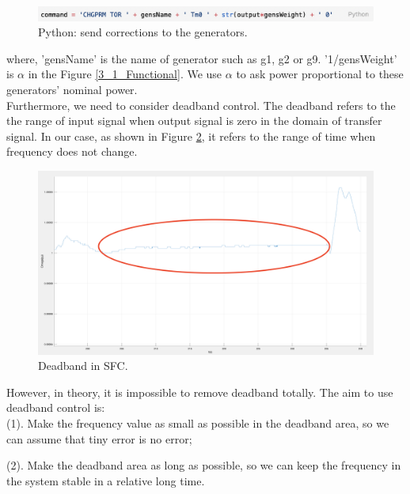 \documentclass{report}
\begin{document}
\begin{figure}[htbp]
\centering
\includegraphics[width = .999\textwidth]{figure/3_3_code2.png}
\caption{Python: send corrections to the generators.}
\label{3_3_code2}
\end{figure}

where, 'gensName' is the name of generator such as g1, g2 or g9. '1/gensWeight' is $\alpha$ in the Figure \textcolor{red}{\ref{3_1_Functional}}. We use $\alpha$ to ask power proportional to these generators' nominal power. \\

Furthermore, we need to consider deadband control. The deadband refers to the the range of input signal when output signal is zero in the domain of transfer signal. In our case, as shown in Figure \textcolor{red}{\ref{3_3_deadband}}, it refers to the range of time when frequency does not change. \\

\begin{figure}[htbp]
\centering
\includegraphics[width = .999\textwidth]{figure/3_3_deadband.png}
\caption{Deadband in SFC.}
\label{3_3_deadband}
\end{figure}


However, in theory, it is impossible to remove deadband totally. The aim to use deadband control is:\\
	
    (1). Make the frequency value as small as possible in the deadband area, so we can assume that tiny error is no error;
    
	(2). Make the deadband area as long as possible, so we can keep the frequency in the system stable in a relative long time. \\
\end{document}
